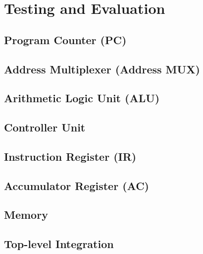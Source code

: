 \section{Testing and Evaluation}\label{sec:testing_and_evaluation} %
\subsection{Program Counter (PC)}

\subsection{Address Multiplexer (Address MUX)}

\subsection{Arithmetic Logic Unit (ALU)}

\subsection{Controller Unit}

\subsection{Instruction Register (IR)}

\subsection{Accumulator Register (AC)}

\subsection{Memory}

\subsection{Top-level Integration}
